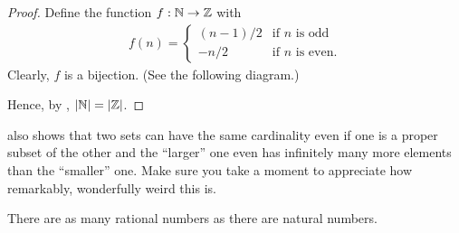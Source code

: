 \begin{proof}
  Define the function $f : \mathbb N \to \mathbb Z$ with
  \begin{align*}
    f(n) =
    \begin{cases}
      (n - 1) / 2 & \text{if $n$ is odd} \\
      - n / 2 & \text{if $n$ is even}.
    \end{cases}
  \end{align*}
  Clearly, $f$ is a bijection. (See the following diagram.)

  \begin{tightfigure}
    \centering
  \end{tightfigure}

  Hence, by , $| \mathbb N | = | \mathbb Z |$.
\end{proof}

\begin{remark}
   also shows that two sets can have
  the same cardinality even if one is a proper subset of the other
  and the ``larger'' one even has infinitely many more elements than
  the ``smaller'' one. Make sure you take a moment to appreciate how
  remarkably, wonderfully weird this is.
\end{remark}

\begin{theorem}[$\abs{\QQ} = \abs{\NN}$]
  There are as many rational numbers as there are natural numbers.
\end{theorem}

